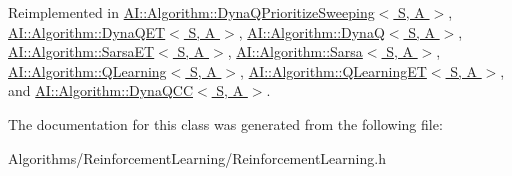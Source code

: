 Reimplemented in \hyperlink{classAI_1_1Algorithm_1_1DynaQPrioritizeSweeping_ad08b55f3cf927189dd31abf9fc1c2959}{A\-I\-::\-Algorithm\-::\-Dyna\-Q\-Prioritize\-Sweeping$<$ S, A $>$}, \hyperlink{classAI_1_1Algorithm_1_1DynaQET_a53b0e06842fbb802acfa5384a84ad448}{A\-I\-::\-Algorithm\-::\-Dyna\-Q\-E\-T$<$ S, A $>$}, \hyperlink{classAI_1_1Algorithm_1_1DynaQ_a4542226b17db4ed8a2c5ec17d37dc42f}{A\-I\-::\-Algorithm\-::\-Dyna\-Q$<$ S, A $>$}, \hyperlink{classAI_1_1Algorithm_1_1SarsaET_adf13376b7ec8fdfa2b19ffadb1aa81e7}{A\-I\-::\-Algorithm\-::\-Sarsa\-E\-T$<$ S, A $>$}, \hyperlink{classAI_1_1Algorithm_1_1Sarsa_ae1d62478d3e31cace3fb594e05f83d1c}{A\-I\-::\-Algorithm\-::\-Sarsa$<$ S, A $>$}, \hyperlink{classAI_1_1Algorithm_1_1QLearning_a042e1987ce21a94f59603c4cb1eeed82}{A\-I\-::\-Algorithm\-::\-Q\-Learning$<$ S, A $>$}, \hyperlink{classAI_1_1Algorithm_1_1QLearningET_a9a245dcb3ca8f26b37e5a6daa6d4a898}{A\-I\-::\-Algorithm\-::\-Q\-Learning\-E\-T$<$ S, A $>$}, and \hyperlink{classAI_1_1Algorithm_1_1DynaQCC_ae23b8f0afbb9fc5024aef9ce720c9b84}{A\-I\-::\-Algorithm\-::\-Dyna\-Q\-C\-C$<$ S, A $>$}.



The documentation for this class was generated from the following file\-:\begin{DoxyCompactItemize}
\item 
Algorithms/\-Reinforcement\-Learning/Reinforcement\-Learning.\-h\end{DoxyCompactItemize}
